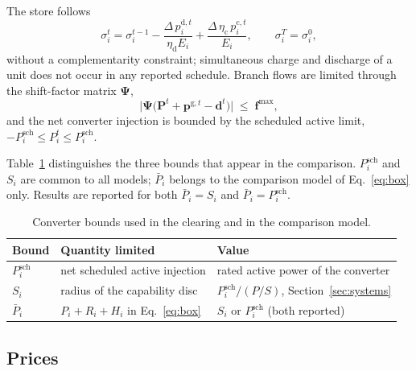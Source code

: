 The store follows
%
\begin{equation}
  \sigma_i^{t} = \sigma_i^{t-1}
    - \frac{\Delta \, p^{\mathrm{d},t}_i}{\eta_{\mathrm{d}} E_i}
    + \frac{\Delta \, \eta_{\mathrm{c}} \, p^{\mathrm{c},t}_i}{E_i} ,
  \qquad \sigma_i^{T} = \sigma_i^{0} ,
  \label{eq:store}
\end{equation}
%
without a complementarity constraint; simultaneous charge and discharge of a
unit does not occur in any reported schedule. Branch flows are limited through
the shift-factor matrix $\boldsymbol{\Psi}$,
%
\begin{equation}
  \big| \boldsymbol{\Psi} \big( \mathbf{P}^t + \mathbf{p}^{\mathrm{g},t}
  - \mathbf{d}^t \big) \big| \;\le\; \mathbf{f}^{\max} ,
  \label{eq:flows}
\end{equation}
%
and the net converter injection is bounded by the scheduled active limit,
$-P^{\mathrm{sch}}_i \le P_i^t \le P^{\mathrm{sch}}_i$.

Table~\ref{tab:bounds} distinguishes the three bounds that appear in the
comparison. $P^{\mathrm{sch}}_i$ and $S_i$ are common to all models;
$\bar{P}_i$ belongs to the comparison model of Eq.~\eqref{eq:box} only.
Results are reported for both $\bar{P}_i = S_i$ and
$\bar{P}_i = P^{\mathrm{sch}}_i$.

\begin{table}[t]
  \caption{Converter bounds used in the clearing and in the comparison
  model.}
  \label{tab:bounds}
  \centering
  \small
  \begin{tabularx}{\columnwidth}{@{}l X X@{}}
    \toprule
    Bound & Quantity limited & Value \\
    \midrule
    $P^{\mathrm{sch}}_i$ & net scheduled active injection
      & rated active power of the converter \\
    $S_i$ & radius of the capability disc
      & $P^{\mathrm{sch}}_i / (P/S)$, Section~\ref{sec:systems} \\
    $\bar{P}_i$ & $P_i + R_i + H_i$ in Eq.~\eqref{eq:box}
      & $S_i$ or $P^{\mathrm{sch}}_i$ (both reported) \\
    \bottomrule
  \end{tabularx}
\end{table}

\subsection{Prices}
\label{sec:prices}

